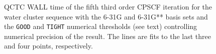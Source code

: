 \documentclass[prl,aps,twocolumn,showpacs,twocolumngrid,superbib]{revtex4}
\begin{document}
\begin{figure}[t]
  \caption{\protect
    QCTC WALL time of the fifth third order CPSCF iteration for
    the water cluster sequence with the 6-31G and 6-31G** 
    basis sets and the {\tt GOOD} and {\tt TIGHT} 
    numerical thresholds (see text) controlling numerical
    precision of the result. The lines are fits to the 
    last three and four points, respectively.
  }\label{fig:Gamma_QCTC_Timing}
\end{figure}
\end{document}
